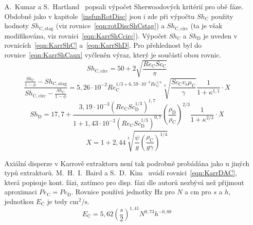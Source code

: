 A.~Kumar a S.~Hartland~\cite{Kumar1999} popsali výpočet Sherwoodových kritérií pro obě fáze.
Obdobně jako v kapitole~\ref{insfunRotDisc} jsou i zde při výpočtu $Sh_\mathrm{C}$ použity hodnoty $Sh_\mathrm{C,stag}$ (viz rovnice~\ref{eqn:rotDiscShCstag}) a $Sh_\mathrm{C,circ}$ (ta je však modifikována, viz rovnici~\ref{eqn:KarrShCcirc}).
Výpočet $Sh_\mathrm{C}$ a $Sh_\mathrm{D}$ je uveden v rovnicích~\ref{eqn:KarrShC} a~\ref{eqn:KarrShD}.
Pro přehlednost byl do rovnice~\ref{eqn:KarrShCaux} vyčleněn výraz, který je součástí obou rovnic.
\begin{equation}
\label{eqn:KarrShCcirc}
	Sh_\mathrm{C,circ} = 50 + 2 \sqrt{ \frac{ Re_\mathrm{C} Sc_\mathrm{C} }{ \pi } }
\end{equation}
\begin{equation}
\label{eqn:KarrShC}
	\frac{ \frac{ Sh_\mathrm{C} }{ 1-\phi } - Sh_\mathrm{C,stag} }{ Sh_\mathrm{C,circ} - \frac{ Sh_\mathrm{C} }{ 1-\phi }} =
	5,26 \cdot 10^{-2} Re_\mathrm{C}^{1/3 + 6,59 \cdot 10^{-2} Re_\mathrm{C}^{1/4}}
	\sqrt[3]{ \frac{ Sc_\mathrm{C} v_\mathrm{s} \mu_\mathrm{C} }{ \gamma } }
	\frac{ 1 }{ 1 + \kappa^{1,1} }
	\cdot X
\end{equation}
\begin{equation}
\label{eqn:KarrShD}
	Sh_\mathrm{D} = 17,7 +
	\frac{ 3,19 \cdot 10^{-3} (Re_\mathrm{C} Sc_\mathrm{D}^{1/3})^{1,7} }{ 1 + 1,43 \cdot 10^{-2} (Re_\mathrm{C} Sc_\mathrm{D}^{1/3})^{0,7} }
	\left( \frac{ \rho_\mathrm{D} }{ \rho_\mathrm{C} } \right)^{2/3}
	\frac{1}{ 1 + \kappa^{2/3} }
	\cdot X
\end{equation}
\begin{equation}
\label{eqn:KarrShCaux}
	X = 1 + 2,44 \sqrt[3]{ \frac{ \psi }{ g } \left( \frac{ \rho_\mathrm{C} }{ g \gamma } \right)^{1/4} }
\end{equation}

Axiální disperze v Karrově extraktoru není tak podrobně probádána jako u jiných typů extraktorů.
M.~H.~I.~Baird a S.~D.~Kim~\cite{Baird1976} uvádí rovnici~\ref{eqn:KarrDAC}, která popisuje kont. fázi, zatímco pro disp. fázi dle autorů nezbývá než přijmout aproximaci $Pe_\mathrm{C} = Pe_\mathrm{D}$.
Rovnice používá jednotky Hz pro $N$ a cm pro $s$ a $h$, jednotkou $E_\mathrm{C}$ je tedy $\mathrm{cm^2/s}$.
\begin{equation}
\label{eqn:KarrDAC}
	E_\mathrm{C} = 5,62 \left( \frac{s}{2} \right)^{1,41} N^{0,73} h^{-0,88}
\end{equation}



